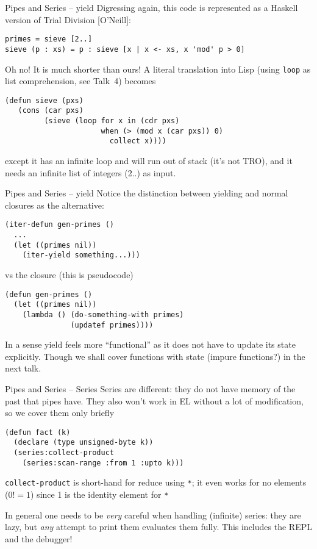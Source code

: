 \documentclass[presentation]{beamer}
\begin{document}
\begin{frame}[fragile]{Pipes and Series -- yield}
Digressing again, this code is represented as a Haskell version of Trial Division [O'Neill]:
\begin{verbatim}
primes = sieve [2..]
sieve (p : xs) = p : sieve [x | x <- xs, x 'mod' p > 0]
\end{verbatim}

Oh no!  It is much shorter than ours!  A literal translation into Lisp (using \texttt{loop} as list comprehension, see Talk~4) becomes
\begin{verbatim}
(defun sieve (pxs)
   (cons (car pxs)
         (sieve (loop for x in (cdr pxs)
                      when (> (mod x (car pxs)) 0)
                        collect x))))
\end{verbatim}
except it has an infinite loop and will run out of stack (it's not TRO), and it needs an infinite list of integers (2..) as input.
\end{frame}

\begin{frame}[fragile]{Pipes and Series -- yield}
  Notice the distinction between yielding and normal closures as the alternative:
\begin{verbatim}
(iter-defun gen-primes ()
  ...
  (let ((primes nil))
    (iter-yield something...)))
\end{verbatim}
vs the closure (this is pseudocode)
\begin{verbatim}
(defun gen-primes ()
  (let ((primes nil))
    (lambda () (do-something-with primes)
               (updatef primes))))
\end{verbatim}

In a sense yield feels more ``functional'' as it does not have to update its state explicitly.  Though we shall cover functions with state (impure functions?) in the next talk.
\end{frame}

\begin{frame}[fragile]{Pipes and Series -- Series}
Series are different: they do not have memory of the past that pipes have.  They also won't work in EL without a lot of modification, so we cover them only briefly
\begin{verbatim}
(defun fact (k)
  (declare (type unsigned-byte k))
  (series:collect-product
    (series:scan-range :from 1 :upto k)))
\end{verbatim}
\texttt{collect-product} is short-hand for reduce using \texttt{*}; it even works for no elements ($0!=1$) since 1 is the identity element for \texttt{*}

\medskip
In general one needs to be \emph{very} careful when handling (infinite) series: they are lazy, but \emph{any} attempt to print them evaluates them fully.  This includes the REPL and the debugger!
\end{frame}
\end{document}
